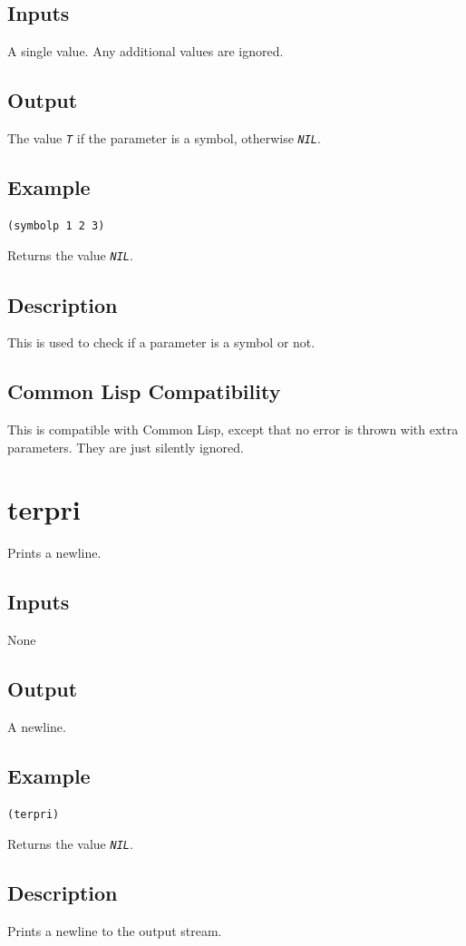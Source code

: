 \documentclass[10pt, openany]{book}
\newcommand{\constant}[1]{\emph{\texttt{#1}}}
\newcommand{\cl}{Common Lisp}
\begin{document}
\subsection{Inputs}
A single value.  Any additional values are ignored.
\subsection{Output}
The value \constant{T} if the parameter is a symbol, otherwise \constant{NIL}.
\subsection{Example}
\begin{lstlisting}
(symbolp 1 2 3)
\end{lstlisting}
Returns the value \constant{NIL}.
\subsection{Description}
This is used to check if a parameter is a symbol or not.
\subsection{Common Lisp Compatibility}
This is compatible with \cl, except that no error is thrown with extra parameters.  They are just silently ignored.

\section{terpri}
Prints a newline.
\subsection{Inputs}
None
\subsection{Output}
A newline.
\subsection{Example}
\begin{lstlisting}
(terpri)
\end{lstlisting}
Returns the value \constant{NIL}.
\subsection{Description}
Prints a newline to the output stream.
\end{document}
